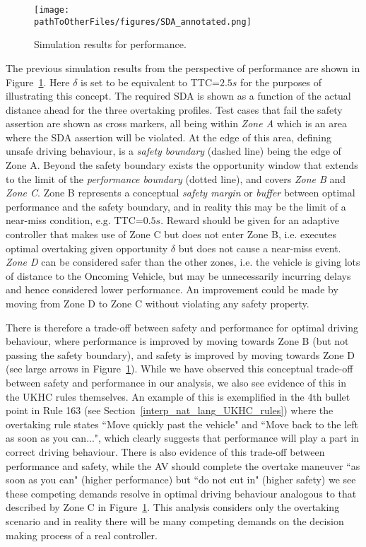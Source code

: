 \begin{figure}[t]
    \centering
    \texttt{[image: \\pathToOtherFiles/figures/SDA\_annotated.png]}
    \caption{Simulation results for performance.}
    \label{fig:performance_results}
\end{figure}

The previous simulation results from the perspective of performance are shown in Figure~\ref{fig:performance_results}. Here $\delta$ is set to be equivalent to TTC=$2.5s$ \cite{Robbins2018,Chen2015,wang2019analysis} for the purposes of illustrating this concept. The required SDA is shown as a function of the actual distance ahead for the three overtaking profiles. Test cases that fail the safety assertion are shown as cross markers, all being within \emph{Zone A} which is an area where the SDA assertion will be violated. At the edge of this area, defining unsafe driving behaviour, is a \emph{safety boundary} (dashed line) being the edge of Zone A. Beyond the safety boundary exists the opportunity window that extends to the limit of the \emph{performance boundary} (dotted line), and covers \emph{Zone B} and \emph{Zone C}. Zone B represents a conceptual \emph{safety margin} or \emph{buffer} between optimal performance and the safety boundary, and in reality this may be the limit of a near-miss condition, e.g. TTC=$0.5s$. Reward should be given for an adaptive controller that makes use of Zone C but does not enter Zone B, i.e. executes optimal overtaking given opportunity $\delta$ but does not cause a near-miss event. \emph{Zone D} can be considered safer than the other zones, i.e. the vehicle is giving lots of distance to the Oncoming Vehicle, but may be unnecessarily incurring delays and hence considered lower performance. An improvement could be made by moving from Zone D to Zone C without violating any safety property. 

There is therefore a trade-off between safety and performance for optimal driving behaviour, where performance is improved by moving towards Zone B (but not passing the safety boundary), and safety is improved by moving towards Zone D (see large arrows in Figure~\ref{fig:performance_results}). While we have observed this conceptual trade-off between safety and performance in our analysis, we also see evidence of this in the UKHC rules themselves. An example of this is exemplified in the 4th bullet point in Rule 163 (see Section~\ref{interp_nat_lang_UKHC_rules}) where the overtaking rule states ``Move quickly past the vehicle" and ``Move back to the left as soon as you can...", which clearly suggests that performance will play a part in correct driving behaviour. There is also evidence of this trade-off between performance and safety, while the AV should complete the overtake maneuver ``as soon as you can" (higher performance) but ``do not cut in" (higher safety) we see these competing demands resolve in optimal driving behaviour analogous to that described by Zone C in Figure~\ref{fig:performance_results}. This analysis considers only the overtaking scenario and in reality there will be many competing demands on the decision making process of a real controller. 




